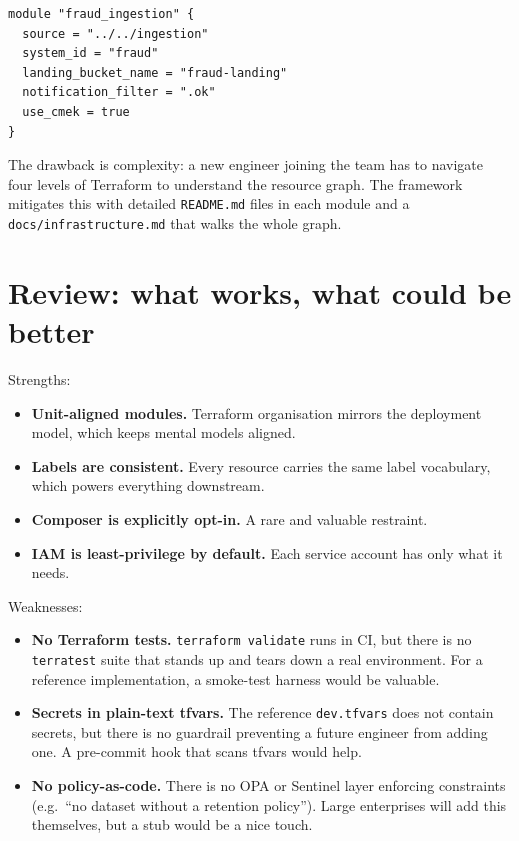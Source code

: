 \documentclass[
  11pt,
  british,
  oneside]{book}
\providecommand{\tightlist}{%
  \setlength{\itemsep}{0pt}\setlength{\parskip}{0pt}}
\begin{document}
\begin{verbatim}
module "fraud_ingestion" {
  source = "../../ingestion"
  system_id = "fraud"
  landing_bucket_name = "fraud-landing"
  notification_filter = ".ok"
  use_cmek = true
}
\end{verbatim}

The drawback is complexity: a new engineer joining the team has to
navigate four levels of Terraform to understand the resource graph. The
framework mitigates this with detailed \texttt{README.md} files in each
module and a \texttt{docs/infrastructure.md} that walks the whole graph.

\hypertarget{review-what-works-what-could-be-better-3}{%
\section{Review: what works, what could be
better}\label{review-what-works-what-could-be-better-3}}

Strengths:

\begin{itemize}
\tightlist
\item
  \textbf{Unit-aligned modules.} Terraform organisation mirrors the
  deployment model, which keeps mental models aligned.
\item
  \textbf{Labels are consistent.} Every resource carries the same label
  vocabulary, which powers everything downstream.
\item
  \textbf{Composer is explicitly opt-in.} A rare and valuable restraint.
\item
  \textbf{IAM is least-privilege by default.} Each service account has
  only what it needs.
\end{itemize}

Weaknesses:

\begin{itemize}
\tightlist
\item
  \textbf{No Terraform tests.} \texttt{terraform\ validate} runs in CI,
  but there is no \texttt{terratest} suite that stands up and tears down
  a real environment. For a reference implementation, a smoke-test
  harness would be valuable.
\item
  \textbf{Secrets in plain-text tfvars.} The reference
  \texttt{dev.tfvars} does not contain secrets, but there is no
  guardrail preventing a future engineer from adding one. A pre-commit
  hook that scans tfvars would help.
\item
  \textbf{No policy-as-code.} There is no OPA or Sentinel layer
  enforcing constraints (e.g.~``no dataset without a retention
  policy''). Large enterprises will add this themselves, but a stub
  would be a nice touch.
\end{itemize}
\end{document}
